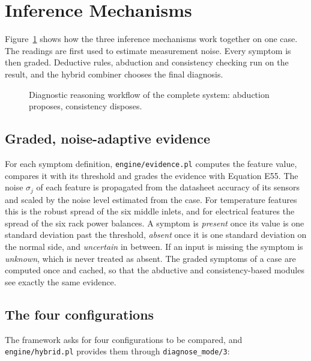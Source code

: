 

\section{Inference Mechanisms}
\label{sec:inference}

Figure~\ref{fig:diagnostic} shows how the three inference mechanisms work together on one case. The readings are first used to estimate measurement noise. Every symptom is then graded. Deductive rules, abduction and consistency checking run on the result, and the hybrid combiner chooses the final diagnosis.

\begin{figure}[htbp]
  \centering
  
  \caption{Diagnostic reasoning workflow of the complete system: abduction proposes, consistency disposes.}
  \label{fig:diagnostic}
\end{figure}

\subsection{Graded, noise-adaptive evidence}

For each symptom definition, \texttt{engine/evidence.pl} computes the feature value, compares it with its threshold and grades the evidence with Equation E55. The noise $\sigma_j$ of each feature is propagated from the datasheet accuracy of its sensors and scaled by the noise level estimated from the case. For temperature features this is the robust spread of the six middle inlets, and for electrical features the spread of the six rack power balances. A symptom is \emph{present} once its value is one standard deviation past the threshold, \emph{absent} once it is one standard deviation on the normal side, and \emph{uncertain} in between. If an input is missing the symptom is \emph{unknown}, which is never treated as absent. The graded symptoms of a case are computed once and cached, so that the abductive and consistency-based modules see exactly the same evidence.

\subsection{The four configurations}

The framework asks for four configurations to be compared, and \texttt{engine/hybrid.pl} provides them through \texttt{diagnose\_mode/3}:

